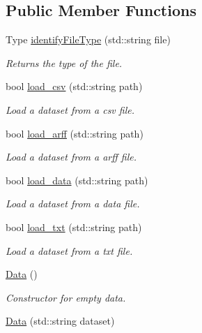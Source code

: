 \subsection*{Public Member Functions}
\begin{DoxyCompactItemize}
\item 
Type \hyperlink{class_data_a80629b0e6a2516d17475c58e77dbae7d}{identify\+File\+Type} (std\+::string file)
\begin{DoxyCompactList}\small\item\em Returns the type of the file. \end{DoxyCompactList}\item 
bool \hyperlink{class_data_a0083fa28fc5282e095c87d79588e9292}{load\+\_\+csv} (std\+::string path)
\begin{DoxyCompactList}\small\item\em Load a dataset from a csv file. \end{DoxyCompactList}\item 
bool \hyperlink{class_data_af7b0e31d7dd93fdb3788d30f5ce38693}{load\+\_\+arff} (std\+::string path)
\begin{DoxyCompactList}\small\item\em Load a dataset from a arff file. \end{DoxyCompactList}\item 
bool \hyperlink{class_data_a327bed527832d41a227f360c0beb838b}{load\+\_\+data} (std\+::string path)
\begin{DoxyCompactList}\small\item\em Load a dataset from a data file. \end{DoxyCompactList}\item 
bool \hyperlink{class_data_a555ae0bc506ec70f7c0411604ca6406b}{load\+\_\+txt} (std\+::string path)
\begin{DoxyCompactList}\small\item\em Load a dataset from a txt file. \end{DoxyCompactList}\item 
\mbox{\label{class_data_af11f741cb7f587e2e495452a8905a22a}} 
\hyperlink{class_data_af11f741cb7f587e2e495452a8905a22a}{Data} ()
\begin{DoxyCompactList}\small\item\em Constructor for empty data. \end{DoxyCompactList}\item 
\hyperlink{class_data_acdbe72be259faa3c285b8e0f6dc89a94}{Data} (std\+::string dataset)

\end{DoxyCompactItemize}
